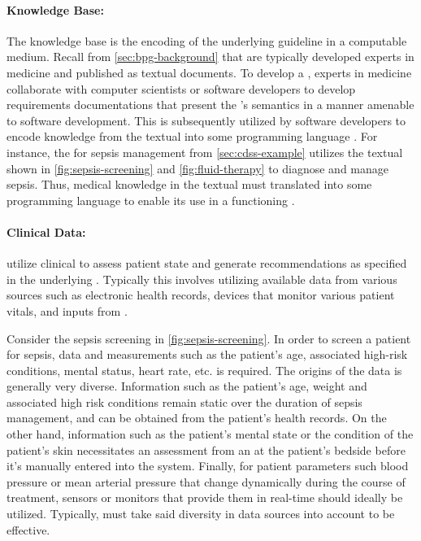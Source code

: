 \paragraph{Knowledge Base:}

The knowledge base is the encoding of the underlying guideline in a
computable medium. Recall from \autoref{sec:bpg-background}
that \BPGs{} are typically developed experts in medicine and published
as textual documents. To develop a \CDSS{}, experts in medicine
collaborate with computer scientists or software developers to
develop requirements documentations that present the \BPG{}'s
semantics in a manner amenable to software development.
This is subsequently utilized by software developers to encode
knowledge from the textual \BPG{} into some programming language \cite{PelegJBI13}.
For instance, the \CDSS{} for sepsis management from \autoref{sec:cdss-example}
utilizes the textual \BPG{} shown in \autoref{fig:sepsis-screening}
and \autoref{fig:fluid-therapy} to diagnose and manage sepsis.
Thus, medical knowledge in the textual \BPG{} must translated into some
programming language to enable its use in a functioning \CDSS{}.

\paragraph{Clinical Data:}

\CDSSs{} utilize clinical to assess patient state and
generate recommendations as specified in the underlying \BPG{}. Typically this involves
utilizing available data from various sources such as electronic health records,
devices that monitor various patient vitals, and inputs from \HCPs{}.

Consider the sepsis screening \BPG{} in \autoref{fig:sepsis-screening}.
In order to screen a patient for sepsis, data and
measurements such as the patient's age, associated high-risk conditions,
mental status, heart rate, etc. is required. The origins
of the data is generally very diverse. Information such
as the patient's age, weight and associated high risk conditions
remain static over the duration of sepsis management, and can be
obtained from the patient's health records.
On the other hand, information such as the patient's mental
state or the condition of the patient's skin necessitates an assessment from an
\HCP{} at the patient's bedside before it's manually entered into the system.
Finally, for patient parameters such blood pressure or mean arterial pressure
that change dynamically during the course of treatment, sensors or monitors
that provide them in real-time should ideally be utilized.
Typically, \CDSS{} must take said diversity in data sources into account
to be effective.

